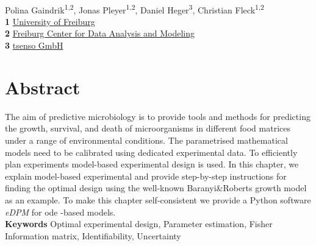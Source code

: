 \documentclass[10pt,A4paper]{article}
\providecommand{\keywords}[1]{\textbf{Keywords } #1}
\begin{document}
\vspace*{0.2in}
\begin{flushleft}
{\Large
\textbf{}}
\newline
\\
Polina Gaindrik\textsuperscript{1,2},
Jonas Pleyer\textsuperscript{1,2},
Daniel Heger\textsuperscript{3},
Christian Fleck\textsuperscript{1,2}
\\
\bigskip
\textbf{1} \href{https://www.fdm.uni-freiburg.de/spatsysbio}{University of Freiburg}\\
\textbf{2} \href{https://www.fdm.uni-freiburg.de/spatsysbio}{Freiburg Center for Data Analysis and Modeling}\\
\textbf{3} \href{https://tsenso.com/en/}{tsenso GmbH}\\
\bigskip

\end{flushleft}
\section*{Abstract}
\linenumbers
The aim of predictive microbiology is to provide tools and methods for predicting the growth, survival, and death of microorganisms in different food matrices under a range of environmental conditions.
The parametrised mathematical models need to be calibrated using dedicated experimental data.
To efficiently plan experiments model-based experimental design is used.
In this chapter, we explain model-based experimental and provide step-by-step instructions for finding the optimal design using the well-known Baranyi\&Roberts growth model as an example.
To make this chapter self-consistent we provide a Python software {\it eDPM} for \ac{ode} -based models.\\
\keywords{Optimal experimental design, Parameter estimation, Fisher Information matrix, Identifiability, Uncertainty}

%
%
%
\end{document}

